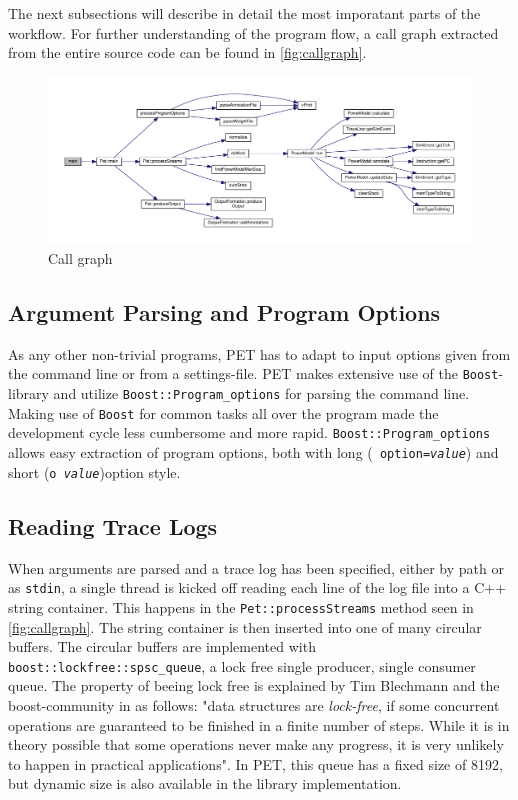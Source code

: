 The next subsections will describe in detail the most imporatant parts of the
workflow. For further understanding of the program flow, a call graph extracted
from the entire source code can be found in \autoref{fig:callgraph}.

\begin{figure}
    \includegraphics[width=\textwidth]{figs/maincallgraph.pdf}
    \caption{Call graph}
    \label{fig:callgraph}
\end{figure}



\subsection{Argument Parsing and Program Options}

As any other non-trivial programs, PET has to adapt to input options given from
the command line or from a settings-file. PET makes extensive use of the
\texttt{Boost}-library \cite{boostwebpage} and utilize
\texttt{Boost::Program\_options} for parsing the command line. Making use of
\texttt{Boost} for common tasks all over the program made the development cycle
less cumbersome and more rapid. \texttt{Boost::Program\_options} allows easy
extraction of program options, both with long (\texttt{\textemdash \textemdash
option=\emph{value}}) and short (\texttt{\textemdash o~\emph{value}})option
style.


\subsection{Reading Trace Logs}

When arguments are parsed and a trace log has been specified, either by path or
as \texttt{stdin}, a single thread is kicked off reading each line of the log
file into a C++ string container. This happens in the
\texttt{Pet::processStreams} method seen in \autoref{fig:callgraph}. The string
container is then inserted into one of many circular buffers. The circular
buffers are implemented with \texttt{boost::lockfree::spsc\_queue}, a lock free
single producer, single consumer queue. The property of beeing lock free is
explained by Tim Blechmann and the boost-community in \cite{boostlockfree} as
follows: "data structures are \emph{lock-free}, if some concurrent operations
are guaranteed to be finished in a finite number of steps. While it is in theory
possible that some operations never make any progress, it is very unlikely to
happen in practical applications". In PET, this queue has a fixed size of 8192,
but dynamic size is also available in the library implementation.

